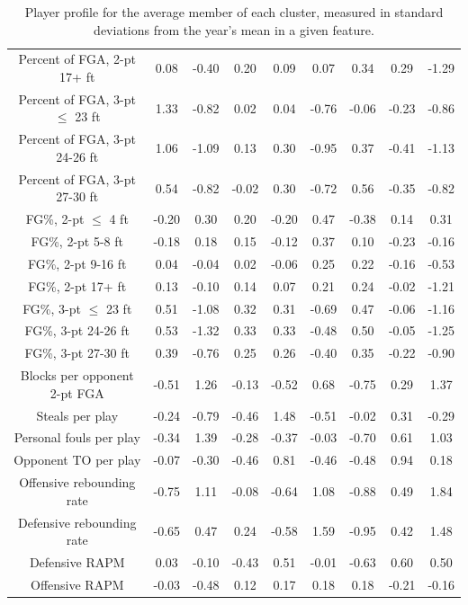 \begin{table}
{\begin{tabular}{ccccccccc}
Percent of FGA, 2-pt 17+ ft    &  0.08 & -0.40 &  0.20 &  0.09 &  0.07 &  0.34 &  0.29 & -1.29 \\
Percent of FGA, 3-pt $\leq$ 23 ft &  1.33 & -0.82 &  0.02 &  0.04 & -0.76 & -0.06 & -0.23 & -0.86 \\
Percent of FGA, 3-pt 24-26 ft  &  1.06 & -1.09 &  0.13 &  0.30 & -0.95 &  0.37 & -0.41 & -1.13 \\
Percent of FGA, 3-pt 27-30 ft  &  0.54 & -0.82 & -0.02 &  0.30 & -0.72 &  0.56 & -0.35 & -0.82 \\
FG\%, 2-pt $\leq$ 4 ft         & -0.20 &  0.30 &  0.20 & -0.20 &  0.47 & -0.38 &  0.14 &  0.31 \\
FG\%, 2-pt 5-8 ft              & -0.18 &  0.18 &  0.15 & -0.12 &  0.37 &  0.10 & -0.23 & -0.16\\
FG\%, 2-pt 9-16 ft             &  0.04 & -0.04 &  0.02 & -0.06 &  0.25 &  0.22 & -0.16 & -0.53\\
FG\%, 2-pt 17+ ft              &  0.13 & -0.10 &  0.14 &  0.07 &  0.21 &  0.24 & -0.02 & -1.21 \\
FG\%, 3-pt $\leq$ 23 ft        &  0.51 & -1.08 &  0.32 &  0.31 & -0.69 &  0.47 & -0.06 & -1.16 \\
FG\%, 3-pt 24-26 ft            &  0.53 & -1.32 &  0.33 &  0.33 & -0.48 &  0.50 & -0.05 & -1.25 \\
FG\%, 3-pt 27-30 ft            &  0.39 & -0.76 &  0.25 &  0.26 & -0.40 &  0.35 & -0.22 & -0.90 \\
Blocks per opponent 2-pt FGA   & -0.51 &  1.26 & -0.13 & -0.52 &  0.68 & -0.75 &  0.29 &  1.37 \\
Steals per play                & -0.24 & -0.79 & -0.46 &  1.48 & -0.51 & -0.02 &  0.31 & -0.29 \\
Personal fouls per play        & -0.34 &  1.39 & -0.28 & -0.37 & -0.03 & -0.70 &  0.61 &  1.03 \\
Opponent TO per play           & -0.07 & -0.30 & -0.46 &  0.81 & -0.46 & -0.48 &  0.94 &  0.18\\
Offensive rebounding rate      & -0.75 &  1.11 & -0.08 & -0.64 &  1.08 & -0.88 &  0.49 &  1.84 \\
Defensive rebounding rate      & -0.65 &  0.47 &  0.24 & -0.58 &  1.59 & -0.95 &  0.42 &  1.48 \\
Defensive RAPM                 &  0.03 & -0.10 & -0.43 &  0.51 & -0.01 & -0.63 &  0.60 &  0.50 \\
Offensive RAPM                 & -0.03 & -0.48 &  0.12 &  0.17 &  0.18 &  0.18 & -0.21 & -0.16 \\
\bottomrule
\end{tabular}
    }
    \caption{Player profile for the average member of each cluster, measured in
    standard deviations from the year's mean in a given feature.}
    \label{tab:clus_means}
\end{table}

